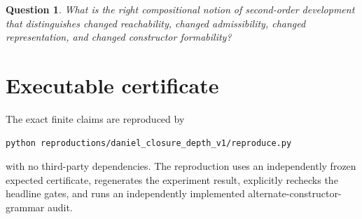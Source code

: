 \documentclass[11pt]{article}
\newtheorem{question}[definition]{Question}
\begin{document}
\begin{question}
What is the right compositional notion of second-order development that distinguishes changed
reachability, changed admissibility, changed representation, and changed constructor formability?
\end{question}

\section{Executable certificate}

The exact finite claims are reproduced by
\begin{verbatim}
python reproductions/daniel_closure_depth_v1/reproduce.py
\end{verbatim}
with no third-party dependencies. The reproduction uses an independently frozen expected
certificate, regenerates the experiment result, explicitly rechecks the headline gates, and runs
an independently implemented alternate-constructor-grammar audit.
\end{document}
